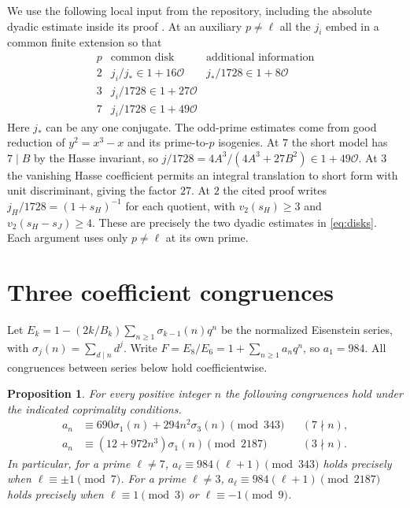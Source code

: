 \documentclass[11pt]{article}
\newtheorem{proposition}[theorem]{Proposition}
\newcommand{\OO}{\mathcal O}
\begin{document}
We use the following local input from the repository, including the absolute dyadic estimate inside its proof \cite[lemma \texttt{smd:lem:gaussdisks}]{repo}. At an auxiliary $p\ne\ell$ all the $j_i$ embed in a common finite extension so that
\begin{equation}\label{eq:disks}
\begin{array}{c|ll}
p&\text{common disk}&\text{additional information}\\ \hline
2 & j_i/j_*\in 1+16\OO & j_*/1728\in1+8\OO\\
3 & j_i/1728\in1+27\OO &\\
7 & j_i/1728\in1+49\OO &
\end{array}
\end{equation}
Here $j_*$ can be any one conjugate. The odd-prime estimates come from good reduction of $y^2=x^3-x$ and its prime-to-$p$ isogenies. At $7$ the short model has $7\mid B$ by the Hasse invariant, so $j/1728=4A^3/(4A^3+27B^2)\in1+49\OO$. At $3$ the vanishing Hasse coefficient permits an integral translation to short form with unit discriminant, giving the factor $27$. At $2$ the cited proof writes $j_H/1728=(1+s_H)^{-1}$ for each quotient, with $v_2(s_H)\ge3$ and $v_2(s_H-s_J)\ge4$. These are precisely the two dyadic estimates in \eqref{eq:disks}. Each argument uses only $p\ne\ell$ at its own prime.

\section{Three coefficient congruences}
Let $E_k=1-(2k/B_k)\sum_{n\ge1}\sigma_{k-1}(n)q^n$ be the
normalized Eisenstein series, with $\sigma_j(n)=\sum_{d\mid n}d^j$.
Write $F=E_8/E_6=1+\sum_{n\ge1}a_nq^n$, so $a_1=984$.
All congruences between series below hold coefficientwise.

\begin{proposition}\label{prop:odd-traces}
For every positive integer $n$ the following congruences hold under
the indicated coprimality conditions.
\begin{align*}
 a_n&\equiv690\sigma_1(n)+294n^2\sigma_3(n)\pmod{343}
       &&(7\nmid n),\\
 a_n&\equiv(12+972n^3)\sigma_1(n)\pmod{2187}
       &&(3\nmid n).
\end{align*}
In particular, for a prime $\ell\ne7$,
$a_\ell\equiv984(\ell+1)\pmod{343}$ holds precisely when
$\ell\equiv\pm1\pmod7$. For a prime $\ell\ne3$,
$a_\ell\equiv984(\ell+1)\pmod{2187}$ holds precisely when
$\ell\equiv1\pmod3$ or $\ell\equiv-1\pmod9$.
\end{proposition}
\end{document}
